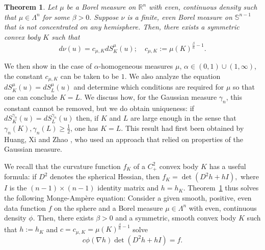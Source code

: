 \documentclass[11pt]{amsart}
\newtheorem{theorem}{Theorem}[section]
\theoremstyle{definition}
\theoremstyle{remark}
\numberwithin{equation}{section}
\newcommand{\R}{\mathbb{R}}
\newcommand{\s}{\mathbb{S}}
\begin{document}
\begin{theorem}
\label{t:third}
Let $\mu$ be a Borel measure on $\R^n$ with even, continuous density such that $\mu \in \Lambda^n$ for some $\beta>0.$ Suppose $\nu$ is a finite, even Borel measure on $\s^{n-1}$ that is not concentrated on any hemisphere.
Then, there exists a symmetric convex body $K$ such that
$$d\nu(u)=c_{\mu,K} dS^{\mu}_{K}(u); \quad c_{\mu,K}:=\mu(K)^{\frac{\beta}{n}-1}.$$
\end{theorem}
We then show in the case of $\alpha$-homogeneous measures $\mu$, $\alpha\in(0,1)\cup(1,\infty)$, the constant $c_{\mu,K}$ can be taken to be $1.$ We also analyze the equation $dS^{\mu}_{K}(u)=dS^{\mu}_{L}(u)$ and determine which conditions are required for $\mu$ so that one can conclude $K=L.$ We discuss how, for the Gaussian measure $\gamma_n$, this constant cannot be removed, but we do obtain uniqueness:
if $dS^{\gamma_n}_{K}(u)=dS^{\gamma_n}_{L}(u)$ then, if $K$ and $L$ are large enough in the sense that $\gamma_n(K),\gamma_n(L)\geq \frac{1}{2}$, one has $K=L$. This result had first been obtained by Huang, Xi and Zhao \cite{HXZ21}, who used an approach that relied on properties of the Gaussian measure.

We recall that the curvature function $f_K$ of a $C^2_+$ convex body $K$ has a useful formula: if $D^2$ denotes the spherical Hessian, then $f_K=\det (D^2 h + hI),$ where $I$ is the $(n-1)\times (n-1)$ identity matrix and $h=h_K$. Theorem~\ref{t:third} thus solves the following Monge-Amp\`ere equation: Consider a given smooth, positive, even data function $f$ on the sphere and a Borel measure $\mu\in\Lambda^n$ with even, continuous density $\phi$. Then, there exists $\beta>0$ and a symmetric, smooth convex body $K$ such that $h:=h_K$ and $c=c_{\mu,K}=\mu(K)^{\frac{\beta}{n}-1}$ solve
$$c\phi(\nabla h)\det (D^2h + h I)=f.$$
\end{document}
